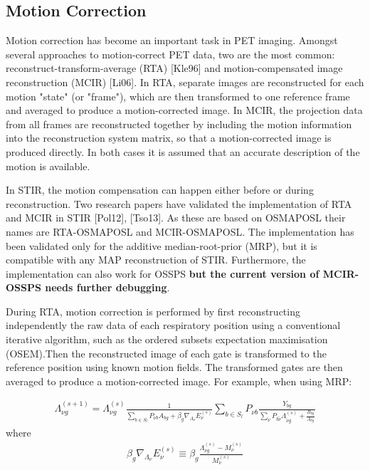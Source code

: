 \documentclass{article}
\begin{document}
{{{\subsection{
Motion Correction}
Motion correction has become an important task in PET imaging. Amongst several approaches to
motion-correct PET data, two are the most common: reconstruct-transform-average (RTA) [Kle96] and
motion-compensated image reconstruction (MCIR) [Li06]. In RTA, separate images are reconstructed for each
motion "state" (or "frame"), which are then transformed to one reference frame and averaged to produce a
motion-corrected image. In MCIR, the projection data from all frames are reconstructed together by
including the motion information into the reconstruction system matrix, so that a motion-corrected image
is produced directly. In both cases it is assumed that an accurate description of the motion is
available.

In STIR, the motion compensation can happen either before or during reconstruction. Two research papers
have validated the implementation of RTA and MCIR in STIR [Pol12], [Tso13]. As these are based on
OSMAPOSL their names are RTA-OSMAPOSL and MCIR-OSMAPOSL. The implementation has been validated only for
the additive median-root-prior (MRP), but it is compatible with any MAP reconstruction of STIR.
Furthermore, the implementation can also work for OSSPS \textbf{but the current version of MCIR-OSSPS
  needs further debugging}.

During RTA, motion correction is performed by first reconstructing independently the raw data of each
respiratory position using a conventional iterative algorithm, such as the ordered subsets expectation
maximisation (OSEM).Then the reconstructed image of each gate is transformed to the reference position
using known motion fields. The transformed gates are then averaged to produce a motion-corrected image.
For example, when using MRP:

\begin{equation}
\begin{array}{rrr}
\Lambda_{\nu g}^{(s+1)}=\Lambda_{\nu g}^{(s)}\frac{1}{ \sum\limits_{b\in S_{l}}P_{\nu b}A_{bg}+\beta_{g} \nabla_{\Lambda_{\nu}} E_{\nu}^{(s)}}\sum\limits_{b\in S_{l}}P_{\nu b}\frac{Y_{bg}}{\sum\limits_{\tilde{\nu}}P_{b\tilde{\nu}}\Lambda_{\tilde{\nu} g}^{(s)}+\frac{B_{bg}}{A_{bg}}}
\end{array}
\end{equation}
\noindent where
\begin{equation}
\begin{array}{rrr}
\beta_{g} \nabla_{\Lambda_{\nu}} E_{\nu}^{(s)} \equiv \beta_{g}\frac{\Lambda_{{\nu}g}^{(s)}-M_{{\nu}}^{(s)}}{M_{{\nu}}^{(s)}}
\end{array}
\end{equation}

}}}
\end{document}
